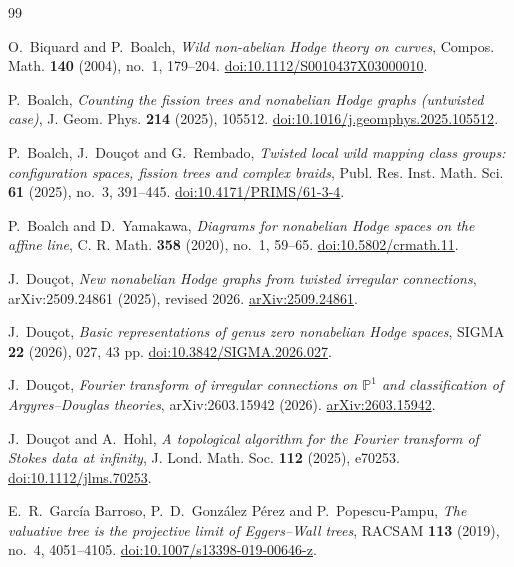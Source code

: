 \documentclass[11pt,a4paper]{amsart}
\theoremstyle{plain}
\theoremstyle{definition}
\begin{document}
\begin{thebibliography}{99}

O.~Biquard and P.~Boalch,
\emph{Wild non-abelian Hodge theory on curves},
Compos. Math. \textbf{140} (2004), no.~1, 179--204.
\href{https://doi.org/10.1112/S0010437X03000010}{doi:10.1112/S0010437X03000010}.

P.~Boalch,
\emph{Counting the fission trees and nonabelian Hodge graphs (untwisted case)},
J. Geom. Phys. \textbf{214} (2025), 105512.
\href{https://doi.org/10.1016/j.geomphys.2025.105512}{doi:10.1016/j.geomphys.2025.105512}.

P.~Boalch, J.~Dou\c cot and G.~Rembado,
\emph{Twisted local wild mapping class groups: configuration spaces, fission trees and complex
braids},
Publ. Res. Inst. Math. Sci. \textbf{61} (2025), no.~3, 391--445.
\href{https://doi.org/10.4171/PRIMS/61-3-4}{doi:10.4171/PRIMS/61-3-4}.

P.~Boalch and D.~Yamakawa,
\emph{Diagrams for nonabelian Hodge spaces on the affine line},
C. R. Math. \textbf{358} (2020), no.~1, 59--65.
\href{https://doi.org/10.5802/crmath.11}{doi:10.5802/crmath.11}.

J.~Dou\c cot,
\emph{New nonabelian Hodge graphs from twisted irregular connections},
arXiv:2509.24861 (2025), revised 2026.
\href{https://arxiv.org/abs/2509.24861}{arXiv:2509.24861}.

J.~Dou\c cot,
\emph{Basic representations of genus zero nonabelian Hodge spaces},
SIGMA \textbf{22} (2026), 027, 43 pp.
\href{https://doi.org/10.3842/SIGMA.2026.027}{doi:10.3842/SIGMA.2026.027}.

J.~Dou\c cot,
\emph{Fourier transform of irregular connections on $\mathbb P^1$ and classification of
Argyres--Douglas theories},
arXiv:2603.15942 (2026).
\href{https://arxiv.org/abs/2603.15942}{arXiv:2603.15942}.

J.~Dou\c cot and A.~Hohl,
\emph{A topological algorithm for the Fourier transform of Stokes data at infinity},
J. Lond. Math. Soc. \textbf{112} (2025), e70253.
\href{https://doi.org/10.1112/jlms.70253}{doi:10.1112/jlms.70253}.

E.~R.~Garc\'ia Barroso, P.~D.~Gonz\'alez P\'erez and P.~Popescu-Pampu,
\emph{The valuative tree is the projective limit of Eggers--Wall trees},
RACSAM \textbf{113} (2019), no.~4, 4051--4105.
\href{https://doi.org/10.1007/s13398-019-00646-z}{doi:10.1007/s13398-019-00646-z}.


\end{thebibliography}
\end{document}
